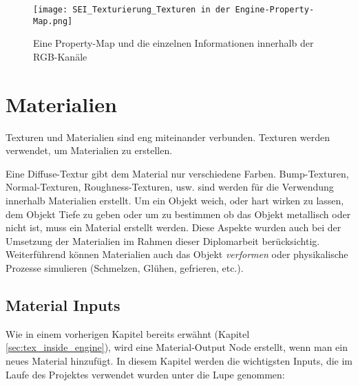 \begin{figure}[H]
    \centering
    \texttt{[image: SEI\_Texturierung\_Texturen in der Engine-Property-Map.png]}
    \caption{Eine Property-Map und die einzelnen Informationen innerhalb der RGB-Kanäle}
    \label{picture:property_map}
\end{figure}


\section{Materialien}
\label{sec:materials}

Texturen und Materialien sind eng miteinander verbunden. Texturen werden verwendet, um Materialien zu erstellen.

Eine Diffuse-Textur gibt dem Material nur verschiedene Farben. Bump-Texturen, Normal-Texturen, Roughness-Texturen, usw.
sind werden für die Verwendung innerhalb Materialien erstellt. Um ein Objekt weich, oder hart wirken zu lassen, dem
Objekt Tiefe zu geben oder um zu bestimmen ob das Objekt metallisch oder nicht ist, muss ein Material erstellt werden.
Diese Aspekte wurden auch bei der Umsetzung der Materialien im Rahmen dieser Diplomarbeit berücksichtig. Weiterführend
können Materialien auch das Objekt \textit{verformen} oder physikalische Prozesse simulieren (Schmelzen, Glühen,
gefrieren, etc.).

\subsection{Material Inputs}
\label{sec:mat_inputs}

Wie in einem vorherigen Kapitel bereits erwähnt (Kapitel \ref{sec:tex_inside_engine}), wird eine Material-Output Node
erstellt, wenn man ein neues Material hinzufügt. In diesem Kapitel werden die wichtigsten Inputs, die im Laufe des
Projektes verwendet wurden unter die Lupe genommen:

